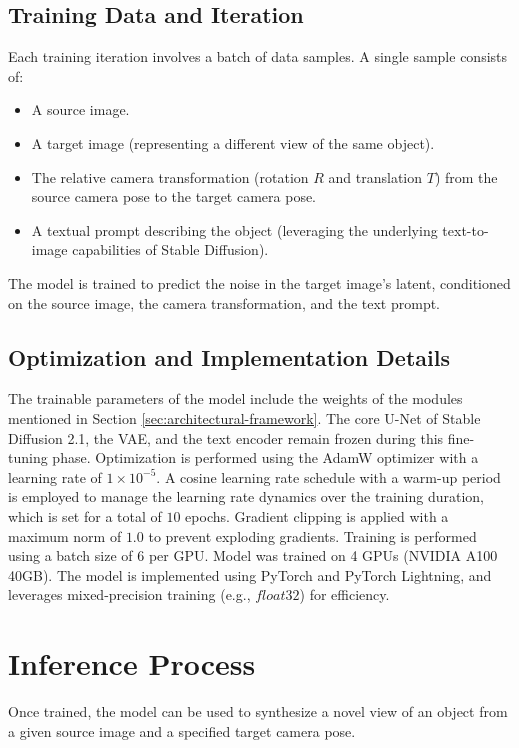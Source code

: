 \subsection{Training Data and Iteration}
Each training iteration involves a batch of data samples. A single sample consists of:
\begin{itemize}
  \item A source image.
  \item A target image (representing a different view of the same object).
  \item The relative camera transformation (rotation $R$ and translation $T$) from the source camera pose to the target camera pose.
  \item A textual prompt describing the object (leveraging the underlying text-to-image capabilities of Stable Diffusion).
\end{itemize}
The model is trained to predict the noise in the target image's latent, conditioned on the source image, the camera transformation, and the text prompt.

\subsection{Optimization and Implementation Details}
The trainable parameters of the model include the weights of the modules mentioned in Section \ref{sec:architectural-framework}. The core U-Net of Stable Diffusion 2.1, the VAE, and the text encoder remain frozen during this fine-tuning phase.
Optimization is performed using the AdamW optimizer \cite{adamw} with a learning rate of $1 \times 10^{-5}$. A cosine learning rate schedule with a warm-up period is employed to manage the learning rate dynamics over the training duration, which is set for a total of $10$ epochs. Gradient clipping is applied with a maximum norm of $1.0$ to prevent exploding gradients. Training is performed using a batch size of $6$ per GPU. Model was trained on 4 GPUs (NVIDIA A100 40GB). The model is implemented using PyTorch and PyTorch Lightning, and leverages mixed-precision training (e.g., $float32$) for efficiency.

\section{Inference Process}
Once trained, the model can be used to synthesize a novel view of an object from a given source image and a specified target camera pose.

